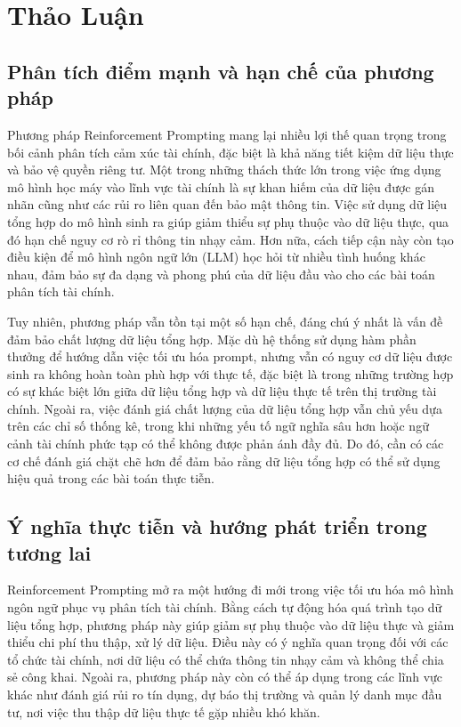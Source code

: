 \documentclass[a4paper,10pt]{article}
\begin{document}
\section{Thảo Luận}
\subsection{Phân tích điểm mạnh và hạn chế của phương pháp}
Phương pháp Reinforcement Prompting mang lại nhiều lợi thế quan trọng trong bối cảnh phân tích cảm xúc tài chính, đặc biệt là khả năng tiết kiệm dữ liệu thực và bảo vệ quyền riêng tư. Một trong những thách thức lớn trong việc ứng dụng mô hình học máy vào lĩnh vực tài chính là sự khan hiếm của dữ liệu được gán nhãn cũng như các rủi ro liên quan đến bảo mật thông tin. Việc sử dụng dữ liệu tổng hợp do mô hình sinh ra giúp giảm thiểu sự phụ thuộc vào dữ liệu thực, qua đó hạn chế nguy cơ rò rỉ thông tin nhạy cảm. Hơn nữa, cách tiếp cận này còn tạo điều kiện để mô hình ngôn ngữ lớn (LLM) học hỏi từ nhiều tình huống khác nhau, đảm bảo sự đa dạng và phong phú của dữ liệu đầu vào cho các bài toán phân tích tài chính.

Tuy nhiên, phương pháp vẫn tồn tại một số hạn chế, đáng chú ý nhất là vấn đề đảm bảo chất lượng dữ liệu tổng hợp. Mặc dù hệ thống sử dụng hàm phần thưởng để hướng dẫn việc tối ưu hóa prompt, nhưng vẫn có nguy cơ dữ liệu được sinh ra không hoàn toàn phù hợp với thực tế, đặc biệt là trong những trường hợp có sự khác biệt lớn giữa dữ liệu tổng hợp và dữ liệu thực tế trên thị trường tài chính. Ngoài ra, việc đánh giá chất lượng của dữ liệu tổng hợp vẫn chủ yếu dựa trên các chỉ số thống kê, trong khi những yếu tố ngữ nghĩa sâu hơn hoặc ngữ cảnh tài chính phức tạp có thể không được phản ánh đầy đủ. Do đó, cần có các cơ chế đánh giá chặt chẽ hơn để đảm bảo rằng dữ liệu tổng hợp có thể sử dụng hiệu quả trong các bài toán thực tiễn.

\subsection{Ý nghĩa thực tiễn và hướng phát triển trong tương lai}
Reinforcement Prompting mở ra một hướng đi mới trong việc tối ưu hóa mô hình ngôn ngữ phục vụ phân tích tài chính. Bằng cách tự động hóa quá trình tạo dữ liệu tổng hợp, phương pháp này giúp giảm sự phụ thuộc vào dữ liệu thực và giảm thiểu chi phí thu thập, xử lý dữ liệu. Điều này có ý nghĩa quan trọng đối với các tổ chức tài chính, nơi dữ liệu có thể chứa thông tin nhạy cảm và không thể chia sẻ công khai. Ngoài ra, phương pháp này còn có thể áp dụng trong các lĩnh vực khác như đánh giá rủi ro tín dụng, dự báo thị trường và quản lý danh mục đầu tư, nơi việc thu thập dữ liệu thực tế gặp nhiều khó khăn.
\end{document}
